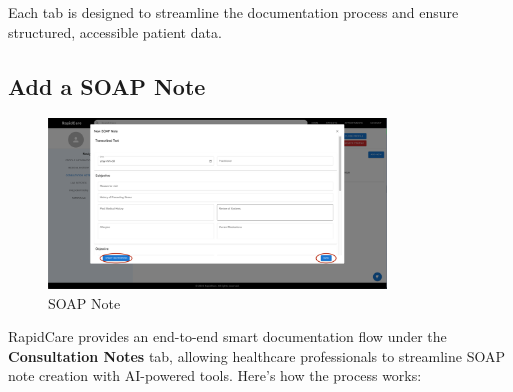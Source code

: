 \documentclass[12pt, titlepage]{article}
\begin{document}
Each tab is designed to streamline the documentation process and ensure structured, accessible patient data.


\subsection{Add a SOAP Note}

\begin{figure}[H]
\centering
\includegraphics[width=0.8\textwidth]{vtt.png}
\caption{SOAP Note}
\label{fig:SOAP Note}
\end{figure}

RapidCare provides an end-to-end smart documentation flow under the \textbf{Consultation Notes} tab, allowing healthcare professionals to streamline SOAP note creation with AI-powered tools. Here’s how the process works:
\end{document}
